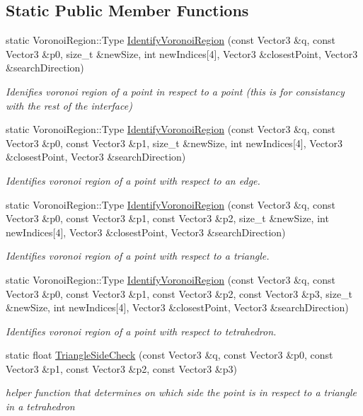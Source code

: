 \subsection*{Static Public Member Functions}
\begin{DoxyCompactItemize}
\item 
static Voronoi\+Region\+::\+Type \hyperlink{classGjk_a9de69ef0925e1afc43236df1d9be865b}{Identify\+Voronoi\+Region} (const Vector3 \&q, const Vector3 \&p0, size\+\_\+t \&new\+Size, int new\+Indices\mbox{[}4\mbox{]}, Vector3 \&closest\+Point, Vector3 \&search\+Direction)
\begin{DoxyCompactList}\small\item\em Idenifies voronoi region of a point in respect to a point (this is for consistancy with the rest of the interface) \end{DoxyCompactList}\item 
static Voronoi\+Region\+::\+Type \hyperlink{classGjk_a5bb6c28096a505d3fce43747309c87da}{Identify\+Voronoi\+Region} (const Vector3 \&q, const Vector3 \&p0, const Vector3 \&p1, size\+\_\+t \&new\+Size, int new\+Indices\mbox{[}4\mbox{]}, Vector3 \&closest\+Point, Vector3 \&search\+Direction)
\begin{DoxyCompactList}\small\item\em Identifies voronoi region of a point with respect to an edge. \end{DoxyCompactList}\item 
static Voronoi\+Region\+::\+Type \hyperlink{classGjk_aaf0caa32680b0c5bf0b00fa03ec360af}{Identify\+Voronoi\+Region} (const Vector3 \&q, const Vector3 \&p0, const Vector3 \&p1, const Vector3 \&p2, size\+\_\+t \&new\+Size, int new\+Indices\mbox{[}4\mbox{]}, Vector3 \&closest\+Point, Vector3 \&search\+Direction)
\begin{DoxyCompactList}\small\item\em Identifies voronoi region of a point with respect to a triangle. \end{DoxyCompactList}\item 
static Voronoi\+Region\+::\+Type \hyperlink{classGjk_afe728560c0bba41c025d04e34a3147b2}{Identify\+Voronoi\+Region} (const Vector3 \&q, const Vector3 \&p0, const Vector3 \&p1, const Vector3 \&p2, const Vector3 \&p3, size\+\_\+t \&new\+Size, int new\+Indices\mbox{[}4\mbox{]}, Vector3 \&closest\+Point, Vector3 \&search\+Direction)
\begin{DoxyCompactList}\small\item\em Identifies voronoi region of a point with respect to tetrahedron. \end{DoxyCompactList}\item 
static float \hyperlink{classGjk_a6a1b3d304d20bc6c762e84dd926f0219}{Triangle\+Side\+Check} (const Vector3 \&q, const Vector3 \&p0, const Vector3 \&p1, const Vector3 \&p2, const Vector3 \&p3)
\begin{DoxyCompactList}\small\item\em helper function that determines on which side the point is in respect to a triangle in a tetrahedron \end{DoxyCompactList}\end{DoxyCompactItemize}


